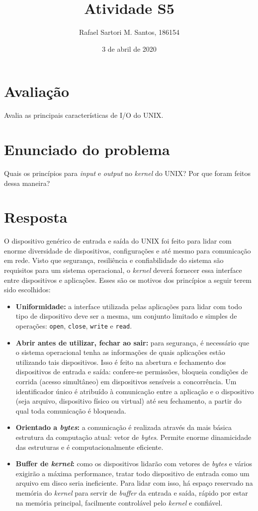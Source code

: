 \documentclass[brazilian,a4paper]{article}
\title{Atividade S5}
\author{Rafael Sartori M. Santos, 186154}
\date{3 de abril de 2020}
\begin{document}
\maketitle

\section*{Avaliação}

Avalia as principais características de I/O do UNIX.

\section*{Enunciado do problema}

Quais os princípios para \textit{input} e \textit{output} no \textit{kernel} do UNIX? Por que foram feitos dessa maneira?

\section*{Resposta}

O dispositivo genérico de entrada e saída do UNIX foi feito para lidar com enorme diversidade de dispositivos, configurações e até mesmo para comunicação em rede. Visto que segurança, resiliência e confiabilidade do sistema são requisitos para um sistema operacional, o \textit{kernel} deverá fornecer essa interface entre dispositivos e aplicações. Esses são os motivos dos princípios a seguir terem sido escolhidos:

\begin{itemize}
    \item \textbf{Uniformidade:} a interface utilizada pelas aplicações para lidar com todo tipo de dispositivo deve ser a mesma, um conjunto limitado e simples de operações: \texttt{open}, \texttt{close}, \texttt{write} e \texttt{read}.
    \item \textbf{Abrir antes de utilizar, fechar ao sair:} para segurança, é necessário que o sistema operacional tenha as informações de quais aplicações estão utilizando tais dispositivos. Isso é feito na abertura e fechamento dos dispositivos de entrada e saída: confere-se permissões, bloqueia condições de corrida (acesso simultâneo) em dispositivos sensíveis a concorrência. Um identificador único é atribuído à comunicação entre a aplicação e o dispositivo (seja arquivo, dispositivo físico ou virtual) até seu fechamento, a partir do qual toda comunicação é bloqueada.
    \item \textbf{Orientado a \textit{bytes}:} a comunicação é realizada através da mais básica estrutura da computação atual: vetor de \textit{bytes}. Permite enorme dinamicidade das estruturas e é computacionalmente eficiente.
    \item \textbf{Buffer de \textit{kernel}:} como os dispositivos lidarão com vetores de \textit{bytes} e vários exigirão a máxima performance, tratar todo dispositivo de entrada como um arquivo em disco seria ineficiente. Para lidar com isso, há espaço reservado na memória do \textit{kernel} para servir de \textit{buffer} da entrada e saída, rápido por estar na memória principal, facilmente controlável pelo \textit{kernel} e confiável.
\end{itemize}
\end{document}
